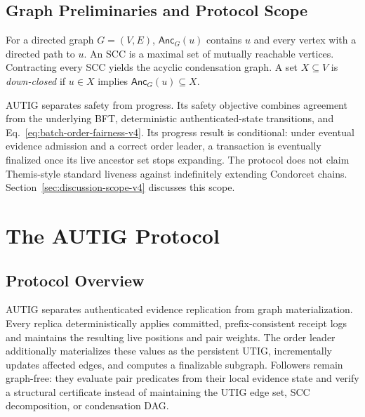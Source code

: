 \subsection{Graph Preliminaries and Protocol Scope}

For a directed graph $G=(V,E)$, $\mathsf{Anc}_G(u)$ contains $u$ and every
vertex with a directed path to $u$.  An SCC is a maximal set of mutually
reachable vertices.  Contracting every SCC yields the acyclic condensation
graph.  A set $X\subseteq V$ is \emph{down-closed} if
$u\in X$ implies $\mathsf{Anc}_G(u)\subseteq X$.

AUTIG separates safety from progress.  Its safety objective combines agreement
from the underlying BFT, deterministic authenticated-state transitions, and
Eq.~\eqref{eq:batch-order-fairness-v4}.  Its progress result is conditional:
under eventual evidence admission and a correct order leader, a transaction is
eventually finalized once its live ancestor set stops expanding.  The protocol
does not claim Themis-style standard liveness against indefinitely extending
Condorcet chains.  Section~\ref{sec:discussion-scope-v4} discusses this scope.

\section{The AUTIG Protocol}
\label{sec:protocol}

\subsection{Protocol Overview}
\label{sec:protocol-overview-v4}

AUTIG separates authenticated evidence replication from graph materialization.
Every replica deterministically applies committed, prefix-consistent receipt
logs and maintains the resulting live positions and pair weights.  The order
leader additionally materializes these values as the persistent UTIG,
incrementally updates affected edges, and computes a finalizable subgraph.
Followers remain graph-free: they evaluate pair predicates from their local
evidence state and verify a structural certificate instead of maintaining the
UTIG edge set, SCC decomposition, or condensation DAG.

